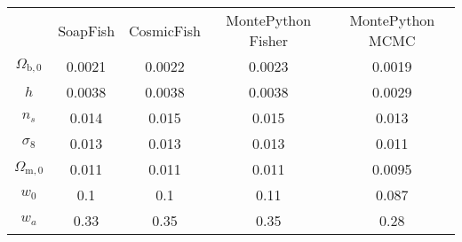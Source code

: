 \begin{table}
\centering
\begin{tabular}{|c|c|c|c|c|}
 & SoapFish & CosmicFish & MontePython Fisher & MontePython MCMC \\
$\Omega_{\mathrm{b},0}$ & 0.0021 & 0.0022 & 0.0023 & 0.0019 \\
$h$ & 0.0038 & 0.0038 & 0.0038 & 0.0029 \\
$n_s$ & 0.014 & 0.015 & 0.015 & 0.013 \\
$\sigma_8$ & 0.013 & 0.013 & 0.013 & 0.011 \\
$\Omega_{\mathrm{m},0}$ & 0.011 & 0.011 & 0.011 & 0.0095 \\
$w_0$ & 0.1 & 0.1 & 0.11 & 0.087 \\
$w_a$ & 0.33 & 0.35 & 0.35 & 0.28 \\
\end{tabular}
\end{table}
